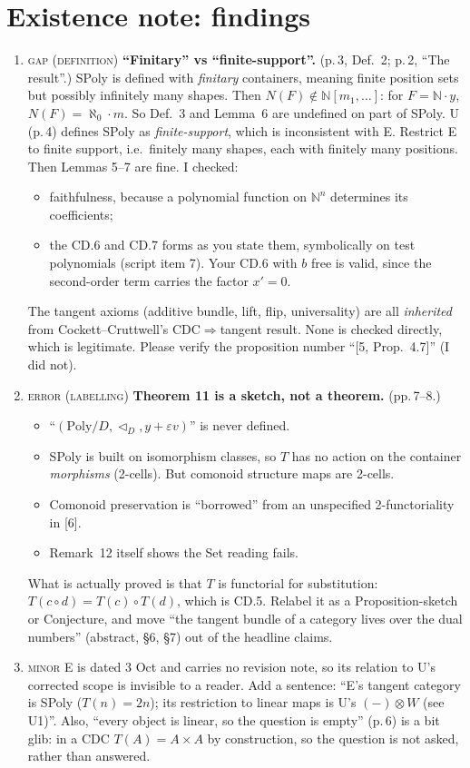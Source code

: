 \documentclass[11pt]{article}
\newcommand{\tri}{\mathbin{\triangleleft}}
\newcommand{\N}{\mathbb{N}}
\newcommand{\iss}[1]{\textsc{#1}}
\begin{document}
\section{Existence note: findings}
\begin{enumerate}[label=\textbf{E\arabic*.},leftmargin=*]
\item \iss{gap (definition)} \textbf{``Finitary'' vs ``finite-support''.} (p.\,3, Def.~2; p.\,2,
``The result''.) SPoly is defined with \emph{finitary} containers, meaning finite position sets but
possibly infinitely many shapes. Then $N(F)\notin\N[m_1,\dots]$: for $F=\N\cdot y$,
$N(F)=\aleph_0\cdot m$. So Def.~3 and Lemma~6 are undefined on part of SPoly. U (p.\,4) defines
SPoly as \emph{finite-support}, which is inconsistent with E. Restrict E to finite support, i.e.\
finitely many shapes, each with finitely many positions. Then Lemmas 5--7 are fine. I checked:
\begin{itemize}[leftmargin=1.2em]
\item faithfulness, because a polynomial function on $\N^n$ determines its coefficients;
\item the CD.6 and CD.7 forms as you state them, symbolically on test polynomials (script item 7).
Your CD.6 with $b$ free is valid, since the second-order term carries the factor $x'=0$.
\end{itemize}
The tangent axioms (additive bundle, lift, flip, universality) are all \emph{inherited} from
Cockett--Cruttwell's CDC$\Rightarrow$tangent result. None is checked directly, which is legitimate.
Please verify the proposition number ``[5, Prop.~4.7]'' (I did not).

\item \iss{error (labelling)} \textbf{Theorem 11 is a sketch, not a theorem.} (pp.\,7--8.)
\begin{itemize}[leftmargin=1.2em]
\item ``$(\mathrm{Poly}/D,\tri_D,y+\varepsilon v)$'' is never defined.
\item SPoly is built on isomorphism classes, so $T$ has no action on the container
\emph{morphisms} (2-cells). But comonoid structure maps are 2-cells.
\item Comonoid preservation is ``borrowed'' from an unspecified 2-functoriality in [6].
\item Remark~12 itself shows the Set reading fails.
\end{itemize}
What is actually proved is that $T$ is functorial for substitution: $T(c\circ d)=T(c)\circ T(d)$,
which is CD.5. Relabel it as a Proposition-sketch or Conjecture, and move ``the tangent bundle of a
category lives over the dual numbers'' (abstract, \S6, \S7) out of the headline claims.

\item \iss{minor} E is dated 3 Oct and carries no revision note, so its relation to U's corrected
scope is invisible to a reader. Add a sentence: ``E's tangent category is SPoly ($T(n)=2n$); its
restriction to linear maps is U's $(-)\otimes W$ (see U1)''. Also, ``every object is linear, so
the question is empty'' (p.\,6) is a bit glib: in a CDC $T(A)=A\times A$ by construction, so the
question is not asked, rather than answered.
\end{enumerate}
\end{document}
